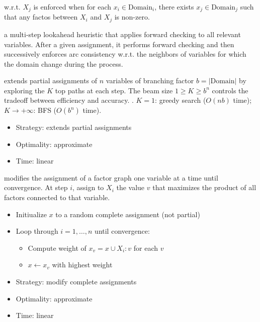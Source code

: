  w.r.t. $X_j$ is enforced when for each
$x_i \in \text{Domain}_i$, there exists $x_j \in \text{Domain}_j$ such that any
factos between $X_i$ and $X_j$ is non-zero.

 a multi-step lookahead heuristic that applies forward checking to all
relevant variables. After a given assignment, it performs forward checking and
then successively enforces arc consistency w.r.t. the neighbors of variables for
which the domain change during the process.

 extends partial assignments of $n$ variables of branching
factor $b = |\text{Domain}|$ by exploring the $K$ top paths at each step. The
beam size $1 \ge K \ge b^n$ controls the tradeoff between efficiency and
accuracy.
. $K=1$: greedy search ($O(nb)$ time); $K
\rightarrow +\infty$: BFS ($O(b^n)$ time).
\begin{itemize}
    \item Strategy: extends partial assignments
    \item Optimality: approximate
    \item Time: linear
\end{itemize}

 modifies the assignment of a
factor graph one variable at a time until convergence. At step $i$, assign to
$X_i$ the value $v$ that maximizes the product of all factors connected to that
variable.
\begin{itemize}
    \item Initiualize $x$ to a random complete assignment (not partial)
    \item Loop through $i = 1, \dots, n$ until convergence: \begin{itemize}
        \item Compute weight of $x_v = x \cup {X_i :v}$ for each $v$
        \item $x \leftarrow x_v$ with highest weight
    \end{itemize}
\end{itemize}
\begin{itemize}
    \item Strategy: modify complete assignments
    \item Optimality: approximate
    \item Time: linear
\end{itemize}

